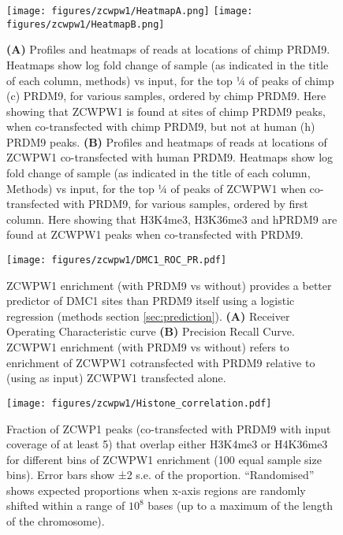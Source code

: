 \begin{figure}[H]
	\centering
	\texttt{[image: figures/zcwpw1/HeatmapA.png]}
	\texttt{[image: figures/zcwpw1/HeatmapB.png]}
	\caption[Zcwpw1 Heatmaps]{
		\textbf{(A)} Profiles and heatmaps of reads at locations of chimp PRDM9.
			Heatmaps show log fold change of sample (as indicated in the title of each column, methods) vs input, for the top ¼ of peaks of chimp (c) PRDM9, for various samples, ordered by chimp PRDM9.
			Here showing that ZCWPW1 is found at sites of chimp PRDM9 peaks, when co-transfected with chimp PRDM9, but not at human (h) PRDM9 peaks.
		\textbf{(B)} Profiles and heatmaps of reads at locations of ZCWPW1 co-transfected with human PRDM9.
			Heatmaps show log fold change of sample (as indicated in the title of each column, Methods) vs input, for the top ¼ of peaks of ZCWPW1 when co-transfected with PRDM9, for various samples, ordered by first column.
			Here showing that H3K4me3, H3K36me3 and hPRDM9 are found at ZCWPW1 peaks when co-transfected with PRDM9.
	}
	\label{fig:Heatmaps}
\end{figure}


\begin{figure}[H]
	\centering
	\texttt{[image: figures/zcwpw1/DMC1\_ROC\_PR.pdf]}
	\caption[DMC1 prediction]{
		ZCWPW1 enrichment (with PRDM9 vs without) provides a better predictor of DMC1 sites than PRDM9 itself using a logistic regression (methods section \ref{sec:prediction}).
		\textbf{(A)} Receiver Operating Characteristic curve
		\textbf{(B)} Precision Recall Curve.
			ZCWPW1 enrichment (with PRDM9 vs without) refers to enrichment of ZCWPW1 cotransfected with PRDM9 relative to (using as input) ZCWPW1 transfected alone.
	}
	\label{fig:ROC}
\end{figure}


\begin{figure}[H]
	\centering
	\texttt{[image: figures/zcwpw1/Histone\_correlation.pdf]}
	\caption[Histone Correlation from peaks]{
		Fraction of ZCWP1 peaks (co-transfected with PRDM9 with input coverage of at least 5) that overlap either H3K4me3 or H4K36me3 for different bins of ZCWPW1 enrichment (100 equal sample size bins).
		Error bars show ±2 s.e. of the proportion.
		``Randomised'' shows expected proportions when x-axis regions are randomly shifted within a range of $10^8$ bases (up to a maximum of the length of the chromosome).
	}
	\label{fig:histone_corr}
\end{figure}


